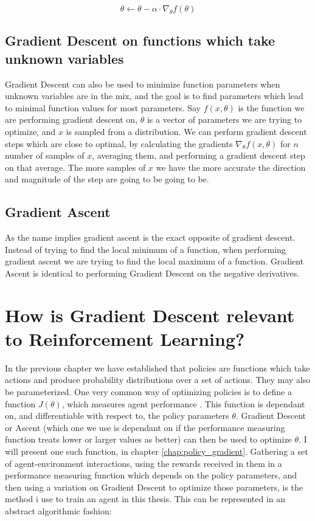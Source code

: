 \begin{equation}\label{Graident_Descent:basic_update_vector}
    \theta \leftarrow \theta - \alpha \cdot \nabla_\theta f(\theta)
\end{equation}

\subsection{Gradient Descent on functions which take unknown variables}\label{gd:random_var}
Gradient Descent can also be used to minimize function parameters when unknown variables are in the mix, and the goal is to find parameters which lead to minimal function values for most parameters. Say $f(x, \theta)$ is the function we are performing gradient descent on, $\theta$ is a vector of parameters we are trying to optimize, and $x$ is sampled from a distribution. We can perform gradient descent steps which are close to optimal, by calculating the gradients $\nabla_\theta f(x, \theta)$ for $n$ number of samples of $x$, averaging them, and performing a gradient descent step on that average. The more samples of $x$ we have the more accurate the direction and magnitude of the step are going to be going to be.

\subsection*{Gradient Ascent}\label{gd:gradient_ascent}
As the name implies gradient ascent is the exact opposite of gradient descent. Instead of trying to find the local minimum of a function, when performing gradient ascent we are trying to find the local maximum of a function. Gradient Ascent is identical to performing Gradient Descent on the negative derivatives. 

\section{How is Gradient Descent relevant to Reinforcement Learning?}\label{gd:relevance}
In the previous chapter we have established that policies are functions which take actions and produce probability distributions over a set of actions. They may also be parameterized. One very common way of optimizing policies is to define a function $J(\theta)$, which measures agent performance . This function is dependant on, and differentiable with respect to, the policy parameters $\theta$. Gradient Descent or Ascent (which one we use is dependant on if the performance measuring function treats lower or larger values as better) can then be used to optimize $\theta$. I will present one such function, in chapter \ref{chap:policy_gradient}. Gathering a set of agent-environment interactions, using the rewards received in them in a performance measuring function which depends on the policy parameters, and then using a variation on Gradient Descent to optimize those parameters, is the method i use to train an agent in this thesis. This can be represented in an abstract algorithmic fashion:

